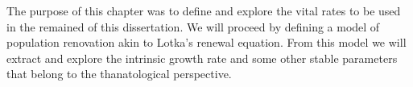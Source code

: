 The purpose of this chapter was to define and explore the vital rates to be used
in the remained of this dissertation. We will proceed by defining a model of
population renovation akin to Lotka's renewal equation. From this model we will
extract and explore the intrinsic growth rate and some other stable
parameters that belong to the thanatological perspective. 

\FloatBarrier



